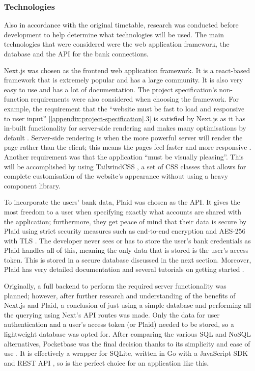 \subsubsection{Technologies}
Also in accordance with the original timetable, research was conducted before development to help determine what technologies will be used. The main technologies that were considered were the web application framework, the database and the API for the bank connections.

Next.js was chosen as the frontend web application framework. It is a react-based framework that is extremely popular and has a large community. It is also very easy to use and has a lot of documentation. The project specification's non-function requirements were also considered when choosing the framework. For example, the requirement that the ``website must be fast to load and responsive to user input'' [\ref{appendix:project-specification}.3] is satisfied by Next.js as it has in-built functionality for server-side rendering and makes many optimisations by default \cite{NextjsPerformance}. Server-side rendering is when the more powerful server will render the page rather than the client; this means the pages feel faster and more responsive \cite{SSR}. Another requirement was that the application ``must be visually pleasing''. This will be accomplished by using TailwindCSS \cite{TailwindCSS}, a set of CSS classes that allows for complete customisation of the website's appearance without using a heavy component library.

To incorporate the users' bank data, Plaid was chosen as the API. It gives the most freedom to a user when specifying exactly what accounts are shared with the application; furthermore, they get peace of mind that their data is secure by Plaid using strict security measures such as end-to-end encryption and AES-256 with TLS \cite{Plaid}. The developer never sees or has to store the user's bank credentials as Plaid handles all of this, meaning the only data that is stored is the user's access token. This is stored in a secure database discussed in the next section. Moreover, Plaid has very detailed documentation and several tutorials on getting started \cite{PlaidGettingStarted}.

Originally, a full backend to perform the required server functionality was planned; however, after further research and understanding of the benefits of Next.js and Plaid, a conclusion of just using a simple database and performing all the querying using Next's API routes was made. Only the data for user authentication and a user's access token (or Plaid) needed to be stored, so a lightweight database was opted for. After comparing the various SQL and NoSQL alternatives, Pocketbase was the final decision thanks to its simplicity and ease of use \cite{NoBackendsPocketbase}. It is effectively a wrapper for SQLite, written in Go with a JavaScript SDK and REST API \cite{PocketbaseJavaScriptSDK}, so is the perfect choice for an application like this.

